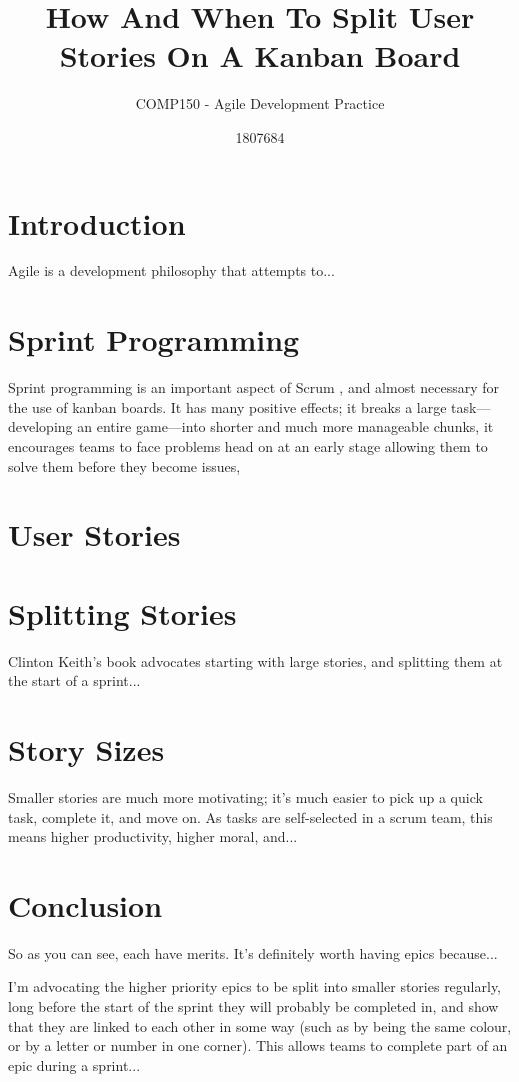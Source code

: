 \documentclass{scrartcl}
\title{How And When To Split User Stories On A Kanban Board}
\subtitle{COMP150 - Agile Development Practice}
\author{1807684}
\begin{document}
\maketitle


\section{Introduction}
Agile is a development philosophy that attempts to...%

\section{Sprint Programming}				%
Sprint programming is an important aspect of Scrum , and almost necessary for the use of kanban boards. It has many positive effects; it breaks a large task—developing an entire game—into shorter and much more manageable chunks, it encourages teams to face problems head on at an early stage allowing them to solve them before they become issues, 

\section{User Stories}


\section{Splitting Stories}
Clinton Keith's book \cite{Keith} advocates starting with large stories, and splitting them at the start of a sprint...%

\section{Story Sizes}
Smaller stories are much more motivating; it's much easier to pick up a quick task, complete it, and move on. As tasks are self-selected in a scrum team, this means higher productivity, higher moral, and...%

\section{Conclusion}
So as you can see, each have merits. It's definitely worth having epics because...%

I'm advocating the higher priority epics to be split into smaller stories regularly, long before the start of the sprint they will probably be completed in, and show that they are linked to each other in some way (such as by being the same colour, or by a letter or number in one corner). This allows teams to complete part of an epic during a sprint...%
\end{document}
